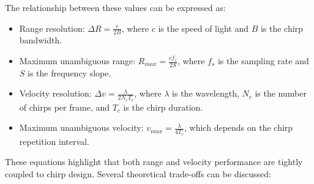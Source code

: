 The relationship between these values can be expressed as:  
\begin{itemize}
    \item Range resolution: $\Delta R = \frac{c}{2B}$, where $c$ is the speed of light and $B$ is the chirp bandwidth.  
    \item Maximum unambiguous range: $R_{max} = \frac{c f_s}{2 S}$, where $f_s$ is the sampling rate and $S$ is the frequency slope.  
    \item Velocity resolution: $\Delta v = \frac{\lambda}{2 N_c T_c}$, where $\lambda$ is the wavelength, $N_c$ is the number of chirps per frame, and $T_c$ is the chirp duration.  
    \item Maximum unambiguous velocity: $v_{max} = \frac{\lambda}{4 T_c}$, which depends on the chirp repetition interval.  
\end{itemize}

These equations highlight that both range and velocity performance are tightly coupled to chirp design.  
Several theoretical trade-offs can be discussed:  


